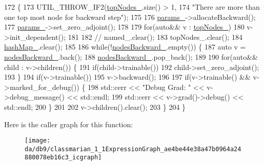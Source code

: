 \begin{DoxyCode}
172                   \{
173     UTIL\_THROW\_IF2(\hyperlink{classmarian_1_1ExpressionGraph_a9dc6da42eac5ff91816adf1fa170c6e7}{topNodes\_}.size() > 1,
174                    \textcolor{stringliteral}{"There are more than one top most node for backward step"});
175 
176     \hyperlink{classmarian_1_1ExpressionGraph_a6abcd5dad584fa5abd9b55b75bb5ef87}{params\_}->allocateBackward();
177     \hyperlink{classmarian_1_1ExpressionGraph_a6abcd5dad584fa5abd9b55b75bb5ef87}{params\_}->set\_zero\_adjoint();
178 
179     \textcolor{keywordflow}{for}(\textcolor{keyword}{auto}&& v : \hyperlink{classmarian_1_1ExpressionGraph_a9dc6da42eac5ff91816adf1fa170c6e7}{topNodes\_})
180       v->init\_dependent();
181 
182     \textcolor{comment}{// named\_.clear();}
183     topNodes\_.clear();
184     \hyperlink{classmarian_1_1ExpressionGraph_aca7c6d3f9253ab38d18d917b8cbd6fd4}{hashMap\_}.clear();
185 
186     \textcolor{keywordflow}{while}(!\hyperlink{classmarian_1_1ExpressionGraph_a8fa57dfedd51284cf51b1ba25401b646}{nodesBackward\_}.empty()) \{
187       \textcolor{keyword}{auto} v = \hyperlink{classmarian_1_1ExpressionGraph_a8fa57dfedd51284cf51b1ba25401b646}{nodesBackward\_}.back();
188       \hyperlink{classmarian_1_1ExpressionGraph_a8fa57dfedd51284cf51b1ba25401b646}{nodesBackward\_}.pop\_back();
189 
190       \textcolor{keywordflow}{for}(\textcolor{keyword}{auto}&& child : v->children()) \{
191         \textcolor{keywordflow}{if}(child->trainable())
192           child->set\_zero\_adjoint();
193       \}
194       \textcolor{keywordflow}{if}(v->trainable())
195         v->backward();
196 
197       \textcolor{keywordflow}{if}(v->trainable() && v->marked\_for\_debug()) \{
198         std::cerr << \textcolor{stringliteral}{"Debug Grad: "} << v->debug\_message() << std::endl;
199         std::cerr << v->grad()->debug() << std::endl;
200       \}
201 
202       v->children().clear();
203     \}
204   \}
\end{DoxyCode}


Here is the caller graph for this function\+:
\nopagebreak
\begin{figure}[H]
\begin{center}
\leavevmode
\texttt{[image: da/db9/classmarian\_1\_1ExpressionGraph\_ae4be44e38a47b0964a24880078eb16c3\_icgraph]}
\end{center}
\end{figure}


